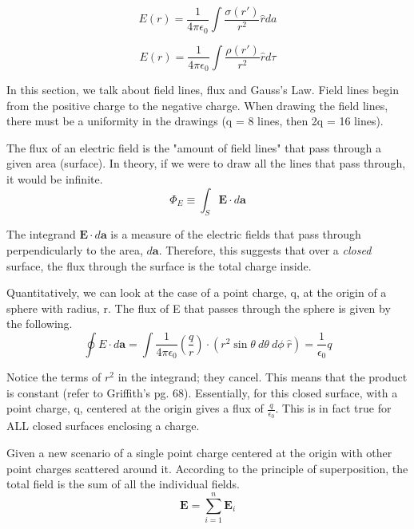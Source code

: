 \begin{equation}
E(r) = \frac{1}{4\pi\epsilon_0}\int\frac{\sigma(r')}{r^2}\hat{r}da
\end{equation}

\begin{equation}
E(r) = \frac{1}{4\pi\epsilon_0}\int\frac{\rho(r')}{r^2}\hat{r}d\tau
\end{equation}

\newpage

In this section, we talk about field lines, flux and Gauss's Law. Field lines begin from the positive charge to the negative charge. When drawing the field lines, there must be a uniformity in the drawings (q = 8 lines, then 2q = 16 lines).
\bigskip

The flux of an electric field is the "amount of field lines" that pass through a given area (surface). In theory, if we were to draw all the lines that pass through, it would be infinite.
\begin{equation}
\Phi_E \equiv\int_S \mathbf{E}\cdot d\mathbf{a}
\end{equation}

The integrand \( \mathbf{E} \cdot d\mathbf{a} \) is a measure of the electric fields that pass through perpendicularly to the area, \( d\mathbf{a} \). Therefore, this suggests that over a \emph{closed} surface, the flux through the surface is the total charge inside. 

Quantitatively, we can look at the case of a point charge, q, at the origin of a sphere with radius, r. The flux of E that passes through the sphere is given by the following.
\begin{equation}
\oint E \cdot d\mathbf{a} = \int \frac{1}{4\pi\epsilon_0}(\frac{q}{r}) \cdot (r^2\sin{\theta}\ d\theta\ d\phi \ \hat{r}) = \frac{1}{\epsilon_0}q
\end{equation}

Notice the terms of \( r^2 \) in the integrand; they cancel. This means that the product is constant (refer to Griffith's pg. 68). Essentially, for this closed surface, with a point charge, q, centered at the origin gives a flux of \( \frac{q}{\epsilon_0} \). This is in fact true for ALL closed surfaces enclosing a charge.

Given a new scenario of a single point charge centered at the origin with other point charges scattered around it. According to the principle of superposition, the total field is the sum of all the individual fields.
\begin{equation}
\mathbf{E} = \sum_{i=1}^{n}\mathbf{E}_i
\end{equation}

